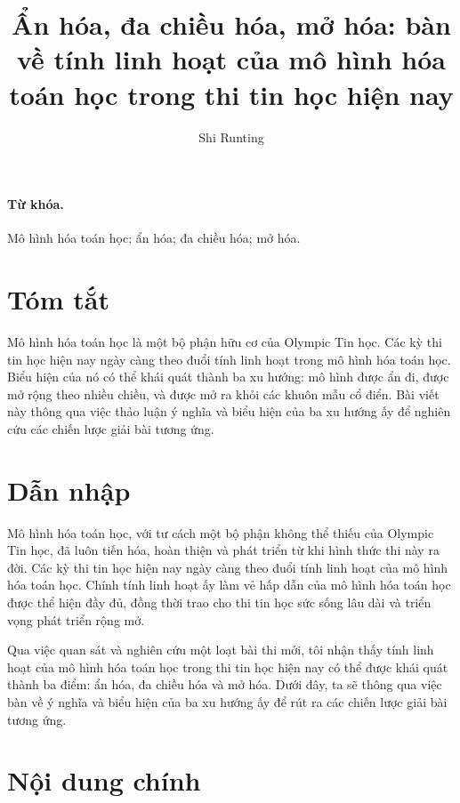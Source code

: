 \documentclass[11pt]{article}
\title{Ẩn hóa, đa chiều hóa, mở hóa: bàn về tính linh hoạt của mô hình hóa toán học trong thi tin học hiện nay}
\author{Shi Runting}
\date{}
\begin{document}
\maketitle


\paragraph{Từ khóa.}
Mô hình hóa toán học; ẩn hóa; đa chiều hóa; mở hóa.

\section*{Tóm tắt}

Mô hình hóa toán học là một bộ phận hữu cơ của Olympic Tin học. Các kỳ thi
tin học hiện nay ngày càng theo đuổi tính linh hoạt trong mô hình hóa toán
học. Biểu hiện của nó có thể khái quát thành ba xu hướng: mô hình được ẩn
đi, được mở rộng theo nhiều chiều, và được mở ra khỏi các khuôn mẫu cổ điển.
Bài viết này thông qua việc thảo luận ý nghĩa và biểu hiện của ba xu hướng
ấy để nghiên cứu các chiến lược giải bài tương ứng.

\section{Dẫn nhập}

Mô hình hóa toán học, với tư cách một bộ phận không thể thiếu của Olympic Tin
học, đã luôn tiến hóa, hoàn thiện và phát triển từ khi hình thức thi này ra
đời. Các kỳ thi tin học hiện nay ngày càng theo đuổi tính linh hoạt của mô
hình hóa toán học. Chính tính linh hoạt ấy làm vẻ hấp dẫn của mô hình hóa
toán học được thể hiện đầy đủ, đồng thời trao cho thi tin học sức sống lâu
dài và triển vọng phát triển rộng mở.

Qua việc quan sát và nghiên cứu một loạt bài thi mới, tôi nhận thấy tính linh
hoạt của mô hình hóa toán học trong thi tin học hiện nay có thể được khái
quát thành ba điểm: ẩn hóa, đa chiều hóa và mở hóa. Dưới đây, ta sẽ thông qua
việc bàn về ý nghĩa và biểu hiện của ba xu hướng ấy để rút ra các chiến lược
giải bài tương ứng.

\section{Nội dung chính}
\end{document}
